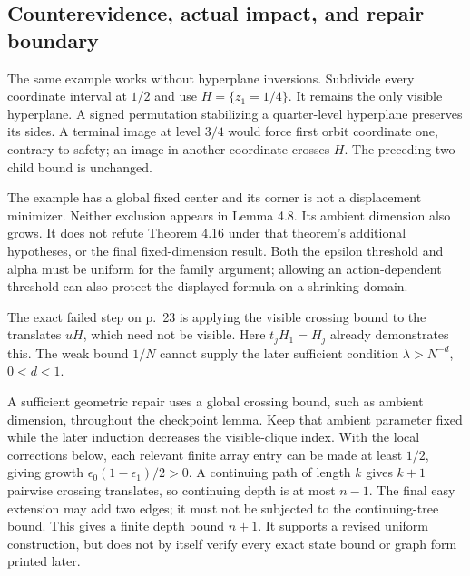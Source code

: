 \documentclass[10pt]{article}
\begin{document}
\subsection*{Counterevidence, actual impact, and repair boundary}
The same example works without hyperplane inversions. Subdivide every coordinate interval at \(1/2\) and use \(H=\{z_1=1/4\}\). It remains the only visible hyperplane. A signed permutation stabilizing a quarter-level hyperplane preserves its sides. A terminal image at level \(3/4\) would force first orbit coordinate one, contrary to safety; an image in another coordinate crosses \(H\). The preceding two-child bound is unchanged.\par
The example has a global fixed center and its corner is not a displacement minimizer. Neither exclusion appears in Lemma 4.8. Its ambient dimension also grows. It does not refute Theorem 4.16 under that theorem’s additional hypotheses, or the final fixed-dimension result. Both the epsilon threshold and alpha must be uniform for the family argument; allowing an action-dependent threshold can also protect the displayed formula on a shrinking domain.\par
The exact failed step on p. 23 is applying the visible crossing bound to the translates \(uH\), which need not be visible. Here \(t_jH_1=H_j\) already demonstrates this. The weak bound \(1/N\) cannot supply the later sufficient condition \(\lambda>N^{-d}\), \(0<d<1\).\par
A sufficient geometric repair uses a global crossing bound, such as ambient dimension, throughout the checkpoint lemma. Keep that ambient parameter fixed while the later induction decreases the visible-clique index. With the local corrections below, each relevant finite array entry can be made at least \(1/2\), giving growth \(\epsilon_0(1-\epsilon_1)/2>0\). A continuing path of length \(k\) gives \(k+1\) pairwise crossing translates, so continuing depth is at most \(n-1\). The final easy extension may add two edges; it must not be subjected to the continuing-tree bound. This gives a finite depth bound \(n+1\). It supports a revised uniform construction, but does not by itself verify every exact state bound or graph form printed later.\par
\end{document}
